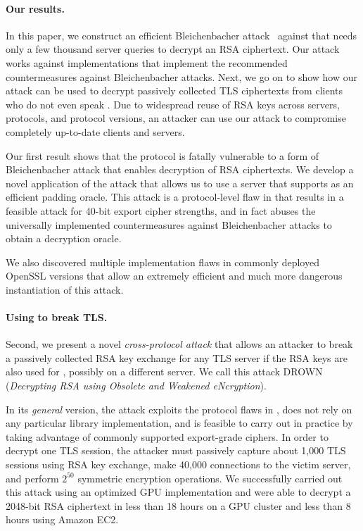 \paragraph{Our results.}
In this paper, we construct an efficient Bleichenbacher attack~\cite{Bleichenbacher}
against \ssltwo that needs only a few thousand server queries to
decrypt an RSA ciphertext.
Our attack works against implementations that
implement the recommended countermeasures against Bleichenbacher attacks.  Next, we go on to show how
our \ssltwo attack can be used to decrypt passively collected TLS
ciphertexts from clients who do not even speak \ssltwo.  Due to
widespread reuse of RSA keys across servers, protocols, and protocol
versions, an attacker can use our attack to compromise completely
up-to-date clients and servers.
\fi

Our first result shows that the \ssltwo protocol is fatally
vulnerable to a form of Bleichenbacher attack
that enables decryption of RSA
ciphertexts.  We develop a novel application of the
attack that allows us to use a server that supports \ssltwo as an
efficient padding oracle.  This attack is a protocol-level flaw in \ssltwo that
results in a feasible attack for 40-bit export cipher strengths,
and in fact abuses the universally implemented countermeasures against
Bleichenbacher attacks to obtain a decryption oracle.

We also discovered multiple implementation flaws in
commonly deployed OpenSSL versions that allow an extremely efficient
\ifext and much more dangerous \fi instantiation of this attack.

\paragraph{Using \ssltwo to break TLS\@.}
Second, we present a novel \textit{cross-protocol attack} that allows an attacker to break a passively collected RSA key exchange for any TLS server if the RSA keys are also used for \ssltwo, possibly on a different server.
We call this attack DROWN (\emph{Decrypting RSA using Obsolete and Weakened eNcryption}).

In its \emph{general} version, the attack exploits the protocol flaws in \ssltwo, does not rely on any particular library implementation, and is feasible to carry out in practice by taking advantage of commonly supported export-grade ciphers.  In order to decrypt one TLS session, the attacker must passively capture about 1,000 TLS sessions using RSA key exchange, make 40,000 \ssltwo connections to the victim server, and perform \begin{math} 2^{50} \end{math} symmetric encryption operations.  We successfully carried out this attack using an optimized GPU implementation and were able to decrypt a 2048-bit RSA ciphertext in less than 18 hours on a GPU cluster and less than 8 hours using Amazon EC2.  

